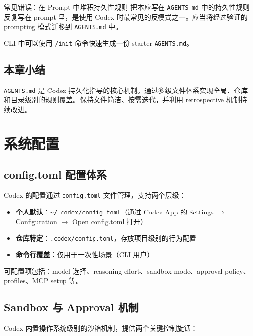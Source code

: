 \documentclass[a4paper]{article}
\begin{document}
\begin{warningbox}{常见错误：在 Prompt 中堆积持久性规则}
把本应写在 \texttt{AGENTS.md} 中的持久性规则反复写在 prompt 里，是使用 Codex 时最常见的反模式之一。应当将经过验证的 prompting 模式迁移到 \texttt{AGENTS.md} 中。
\end{warningbox}

CLI 中可以使用 \texttt{/init} 命令快速生成一份 starter \texttt{AGENTS.md}。

\subsection{本章小结}

\texttt{AGENTS.md} 是 Codex 持久化指导的核心机制。通过多级文件体系实现全局、仓库和目录级别的规则覆盖。保持文件简洁、按需迭代，并利用 retrospective 机制持续改进。

\section{系统配置}

\subsection{config.toml 配置体系}

Codex 的配置通过 \texttt{config.toml} 文件管理，支持两个层级：

\begin{itemize}
    \item \textbf{个人默认}：\texttt{\textasciitilde/.codex/config.toml}（通过 Codex App 的 Settings $\rightarrow$ Configuration $\rightarrow$ Open config.toml 打开）
    \item \textbf{仓库特定}：\texttt{.codex/config.toml}，存放项目级别的行为配置
    \item \textbf{命令行覆盖}：仅用于一次性场景（CLI 用户）
\end{itemize}

可配置项包括：model 选择、reasoning effort、sandbox mode、approval policy、profiles、MCP setup 等。

\subsection{Sandbox 与 Approval 机制}

Codex 内置操作系统级别的沙箱机制，提供两个关键控制旋钮：
\end{document}
